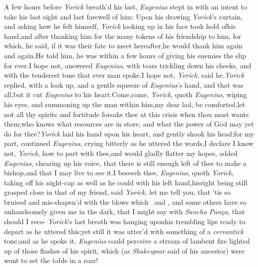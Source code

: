 \documentclass{article}
\begin{document}
A few hours before \textit{Yorick} breath’d his last, \textit{Eugenius} stept in
with an intent to take his last sight and last farewell of him: Upon his drawing
\textit{Yorick}’s curtain, and asking how he felt himself, \textit{Yorick} looking
up in his face took hold of\break his hand,\tsk  and after thanking him
for the many tokens of his friendship to him, for which, he said,
if it was their fate to meet hereafter,\tsk  he would thank him again and
again.\tsk  He told him, he was within a few hours of giving his enemies the
slip for ever.\tsk  I hope not, answered \textit{Eugenius}, with tears trickling
down his cheeks, and with the tenderest tone that ever man spoke.\tsk  I hope
not,\break
\textit{Yorick}, said he.\tsh  \textit{Yorick} replied, with a look
up, and a gentle squeeze of \textit{Eugenius}’s hand, and that was
all,\tsh  but it cut \textit{Eugenius} to his heart.\tsh Come,\tsh\break  come,
\textit{Yorick}, quoth \textit{Eugenius}, wiping his eyes, and summoning up the
man\break
within him,\tsk  my dear lad, be comfort\-ed,\tsk  let not all thy spirits and
fortitude forsake thee at this crisis when thou most wants
them;\tsh  who knows what resources are in store, and what the power of
God may yet do for thee?\tsh  \textit{Yorick}
laid his hand upon his
heart, and gently shook his head;\tsk  for my part, continued \textit{Eugenius},
crying bitterly as he uttered the words,\tsk  I declare I know not,
\textit{Yorick}, how to part with thee,\tsh and\break 
would gladly flatter my hopes, added\break
\textit{Eugenius}, chearing up his voice, that\break
there is still enough left of thee to make\break
a bishop,\tsk and that I may live to see\break 
it.\tsk  I beseech thee, \textit{Eugenius}, quoth\break
\textit{Yorick}, taking off his night-cap as well as he
could with his left hand,\tsk  his\break right being still grasped close in that of
my friend, said
\textit{Yorick}, let me tell you, that ’tis so bruised and mis-shapen’d
with the blows which \astv\ and \astv, and some others have so unhandsomely
given me in the dark, that I might say with \textit{Sancho Pança}, that should I
reco-\break 
{}
\textit{Yorick}’s last breath was hanging upon\break his
trembling lips ready to depart as he uttered this;\tsh  yet still it
was utter’d with something of a \textit{cervantick} tone;\tsh\break and as he
spoke it, \textit{Eugenius} could perceive a stream of lambent fire lighted up
 of those flashes of his
spirit, which (as \textit{Shakespear} said of his ancestor) were wont to set the
table in a roar!
\end{document}
